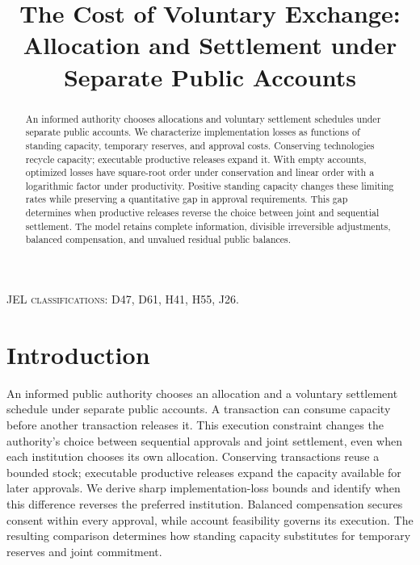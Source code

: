 \documentclass[ecta,draft]{econsocart}
\theoremstyle{definition}
\theoremstyle{definition}
\begin{document}
\begin{frontmatter}
\title{The Cost of Voluntary Exchange:\\
Allocation and Settlement under Separate Public Accounts}
\begin{abstract}
An informed authority chooses allocations and voluntary settlement schedules
under separate public accounts. We characterize implementation losses as
functions of standing capacity, temporary reserves, and approval costs.
Conserving technologies recycle capacity; executable productive releases expand
it. With empty accounts, optimized losses have square-root order under
conservation and linear order with a logarithmic factor under productivity.
Positive standing capacity changes these limiting rates while preserving a
quantitative gap in approval requirements. This gap determines when productive
releases reverse the choice between joint and sequential settlement. The model
retains complete information, divisible irreversible adjustments, balanced
compensation, and unvalued residual public balances.
\end{abstract}
\begin{keyword}
\end{keyword}
\end{frontmatter}
\noindent\textsc{JEL classifications:} D47, D61, H41, H55, J26.

\section{Introduction}

An informed public authority chooses an allocation and a voluntary settlement
schedule under separate public accounts. A transaction can consume capacity
before another transaction releases it. This execution constraint changes
the authority's choice between sequential approvals and joint settlement,
even when each institution chooses its own allocation. Conserving transactions
reuse a bounded stock; executable productive releases expand the capacity
available for later approvals. We derive sharp implementation-loss bounds
and identify when this difference reverses the preferred institution.
Balanced compensation secures consent within every approval, while account
feasibility governs its execution. The resulting comparison determines how
standing capacity substitutes for temporary reserves and joint commitment.
\end{document}
